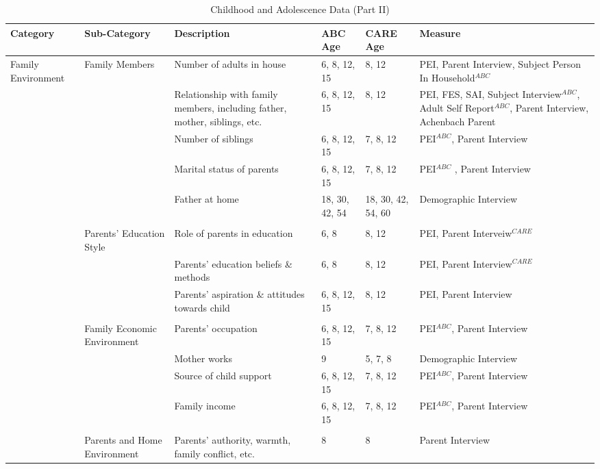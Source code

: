 	
	
\begin{sidewaystable}[H]
\begin{threeparttable}
\small
\caption{Childhood and Adolescence Data (Part II)} \label{tab:youthvars_2}
\centering
\tiny
\begin{tabular}{L{3.5cm} C{3.5cm} C{5cm} C{1.5cm} C{1.5cm} C{6cm}}
\toprule
\textbf{Category}	&	\textbf{Sub-Category}	&	\textbf{Description}	&	\textbf{ABC Age}  	&  \textbf{CARE Age}  & 	\textbf{Measure}	\\ \midrule
Family Environment	&	Family Members	&	Number of adults in house	&	6, 8, 12, 15	&	8, 12	&	PEI, Parent Interview, Subject Person In Household$^{ABC}$		\\
	&		&	Relationship with family members, including father, mother, siblings, etc.	&	6, 8, 12, 15	&	8, 12	&	PEI, FES, SAI, Subject Interview$^{ABC}$, Adult Self Report$^{ABC}$, Parent Interview, Achenbach Parent	\\
	&		&	Number of siblings	&	6, 8, 12, 15	&	7, 8, 12	&	PEI$^{ABC}$, Parent Interview	\\
	&		&	Marital status of parents	&	6, 8, 12, 15	&	7, 8, 12	&	PEI$^{ABC}$	, Parent Interview	\\
		&		& Father at home & 18, 30, 42, 54  & 18, 30, 42, 54, 60 & Demographic Interview \\
	&	\\
	&	Parents' Education Style	&	Role of parents in education	&	6, 8	&	8, 12	&	PEI, Parent Interveiw$^{CARE}$	\\
	&		&	Parents' education beliefs \& methods&	6, 8	&	8, 12 	&	PEI, Parent Interview$^{CARE}$		\\
	&		&	Parents' aspiration \& attitudes towards child	&	6, 8, 12, 15	&	8, 12	&	PEI, Parent Interview	\\
	&	\\
	&	Family Economic Environment	&	Parents' occupation	&	6, 8, 12, 15	&	7, 8, 12	&	PEI$^{ABC}$, Parent Interview	\\
		&							& Mother works & 9 & 5, 7, 8 & Demographic Interview \\
	&		&	Source of child support	&	6, 8, 12, 15	&	7, 8, 12	&	PEI$^{ABC}$, Parent Interview	\\
	&		&	Family income	&	6, 8, 12, 15	&	7, 8, 12	&	PEI$^{ABC}$, Parent Interview	\\
	&	\\
		&	Parents and Home Environment & Parents' authority, warmth, family conflict, etc. & 8 & 8 & Parent Interview \\

\end{tabular}
\end{threeparttable}
\end{sidewaystable}
